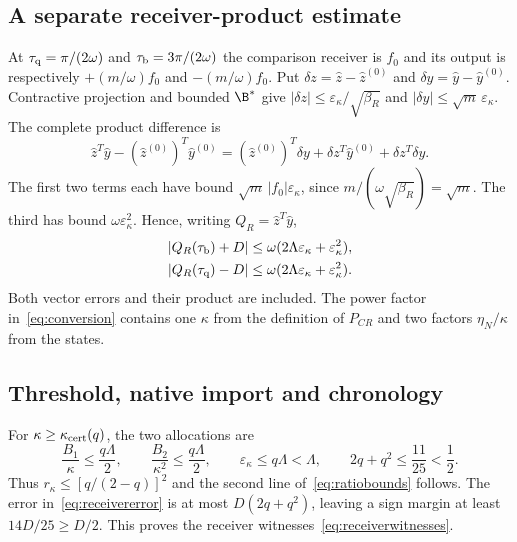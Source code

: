 \subsection{A separate receiver-product estimate}
At $\tau_{\rm q}=\pi/(2\omega)$ and $\tau_{\rm b}=3\pi/(2\omega)$ the comparison receiver is $f_0$ and its output is respectively $+(m/\omega)f_0$ and $-(m/\omega)f_0$. Put $\delta z=\widehat z-\widehat z^{(0)}$ and $\delta y=\widehat y-\widehat y^{(0)}$. Contractive projection and bounded $\B^*$ give
$|\delta z|\le\varepsilon_\kappa/\sqrt{\beta_R}$ and
$|\delta y|\le\sqrt m\,\varepsilon_\kappa$.
The complete product difference is
\begin{equation}\label{eq:product}%
\widehat z^T\widehat y-(\widehat z^{(0)})^T\widehat y^{(0)}
=(\widehat z^{(0)})^T\delta y
+\delta z^T\widehat y^{(0)}+\delta z^T\delta y .
\end{equation}
The first two terms each have bound $\sqrt m\,|f_0|\varepsilon_\kappa$, since
$m/(\omega\sqrt{\beta_R})=\sqrt m$. The third has bound
$\omega\varepsilon_\kappa^2$. Hence, writing $Q_R=\widehat z^T\widehat y$,
\begin{equation}\label{eq:receivererror}%
\begin{gathered}
|Q_R(\tau_{\rm b})+D|\le\omega(2\Lambda\varepsilon_\kappa+\varepsilon_\kappa^2),\\
|Q_R(\tau_{\rm q})-D|\le\omega(2\Lambda\varepsilon_\kappa+\varepsilon_\kappa^2).
\end{gathered}
\end{equation}
Both vector errors and their product are included. The power factor in~\eqref{eq:conversion} contains one $\kappa$ from the definition of $P_{CR}$ and two factors $\eta_N/\kappa$ from the states.

\subsection{Threshold, native import and chronology}
For $\kappa\ge\kappa_{\rm cert}(q)$, the two allocations are
\begin{equation}\label{eq:allocation}%
\frac{B_1}{\kappa}\le\frac{q\Lambda}{2},\qquad
\frac{B_2}{\kappa^2}\le\frac{q\Lambda}{2},\qquad
\varepsilon_\kappa\le q\Lambda<\Lambda,\qquad
2q+q^2\le\frac{11}{25}<\frac12 .
\end{equation}
Thus $r_\kappa\le[q/(2-q)]^2$ and the second line of~\eqref{eq:ratiobounds} follows. The error in~\eqref{eq:receivererror} is at most $D(2q+q^2)$, leaving a sign margin at least $14D/25\ge D/2$. This proves the receiver witnesses~\eqref{eq:receiverwitnesses}.

